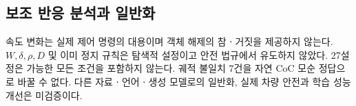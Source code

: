 \begin{revision}
\subsection{보조 반응 분석과 일반화}
속도 변화는 실제 제어 명령의 대용이며 객체 해제의 참ㆍ거짓을 제공하지 않는다. $W,\delta,\rho,D$ 및 이미 정지 규칙은 탐색적 설정이고 안전 법규에서 유도하지 않았다. 27설정은 가능한 모든 조건을 포함하지 않는다. 궤적 불일치 7건을 자연 CoC 모순 정답으로 바꿀 수 없다. 다른 자료ㆍ언어ㆍ생성 모델로의 일반화, 실제 차량 안전과 학습 성능 개선은 미검증이다.
\end{revision}

